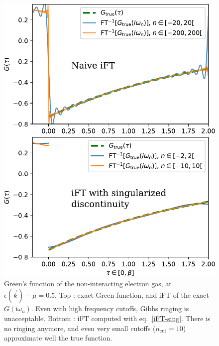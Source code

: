\documentclass[reprint,amsmath,amssymb,aps,pra]{revtex4-2}
\newcommand{\iwn}{\mathrm{i}\omega_n}
\begin{document}
\begin{figure}[H]
\includegraphics[width=\columnwidth]{green-tau-compar-sing.pdf}
\caption{\label{fig:green-tau-compar-sing}Green's function of the non-interacting electron gas, at $\epsilon(\vec{{k}})-\mu=0.5$. Top : exact Green function, and iFT of the exact $G(\iwn)$. Even with high frequency cutoffs, Gibbs ringing is unacceptable. Bottom : iFT computed with eq.\ \ref{iFT-sing}. There is no ringing anymore, and even very small cutoffs ($n_\text{cut}=10$) approximate well the true function.}
\end{figure}
\end{document}
